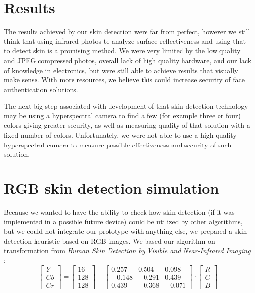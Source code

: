     \section{Results}
        The results achieved by our skin detection were far from perfect,
        however we still think that using infrared photos to analyze surface
        reflectiveness and using that to detect skin is a promising method.
        We were very limited by the low quality and JPEG compressed photos,
        overall lack of high quality hardware, and our lack of knowledge in electronics,
        but were still able to achieve results that visually make sense.
        With more resources, we believe this could increase security of
        face authentication solutions.

        The next big step associated with development of that skin detection
        technology may be using a hyperspectral camera to find a few (for example three
        or four) colors giving greater security, as well as measuring
        quality of that solution with a fixed number of colors.
        Unfortunately, we were not able to use a high quality hyperspectral camera
        to measure possible effectiveness and security of such solution.

    \section{RGB skin detection simulation}
        Because we wanted to have the ability to check how skin detection
        (if it was implemented in a possible future device) could be utilized
        by other algorithms, but we could not integrate our prototype with
        anything else, we prepared a skin-detection heuristic based on RGB images.
        We based our algorithm on transformation from
        \textit{Human Skin Detection by Visible and Near-Infrared Imaging} \cite{toyotaskin}:
        \[
            \begin{bmatrix}
                Y \\
                Cb \\
                Cr
            \end{bmatrix}
            =
            \begin{bmatrix}
                16\\
                128\\
                128
            \end{bmatrix}
            +
             \begin{bmatrix}
                 0.257  &  0.504        &  0.098 \\
                -0.148  & -0.291        &  0.439 \\
                 0.439  & -0.368        & -0.071
            \end{bmatrix}
            \cdot
             \begin{bmatrix}
                R\\
                G\\
                B
            \end{bmatrix}
        \]

